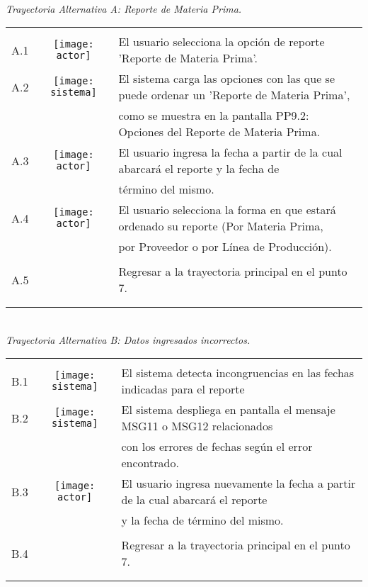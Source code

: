 \documentclass[10pt,spanish]{article}
\providecommand{\tabularnewline}{\\}
\begin{document}
\newpage
	\textit{\large \\Trayectoria Alternativa A: Reporte de Materia Prima.}
	
	\begin{tabular}{ccl}
	& & \tabularnewline
	
	A.1 & \texttt{[image: actor]} & El usuario selecciona la opción de reporte 'Reporte de Materia Prima'.\tabularnewline
		
	A.2 & \texttt{[image: sistema]} & El sistema carga las opciones con las que se puede ordenar un 'Reporte de Materia Prima', \tabularnewline
	& & como se muestra en la pantalla PP9.2: Opciones del Reporte de Materia Prima. \tabularnewline
	
	A.3 & \texttt{[image: actor]} & El usuario ingresa la fecha a partir de la cual abarcará el reporte y la fecha de \tabularnewline
& &	término del mismo.\tabularnewline

    A.4 & \texttt{[image: actor]} & El usuario selecciona la forma en que estará ordenado su reporte (Por Materia Prima,  	\tabularnewline
	& &  por Proveedor o por Línea de Producción).\tabularnewline\tabularnewline
	
	A.5 & & Regresar a la trayectoria principal en el punto 7.\tabularnewline

	
	\tabularnewline\tabularnewline	
	\end{tabular}

\textit{\large \\Trayectoria Alternativa B: Datos ingresados incorrectos.}

\begin{tabular}{ccl}
	& & \tabularnewline
	
	B.1 & \texttt{[image: sistema]} & El sistema detecta incongruencias en las fechas indicadas para el reporte\tabularnewline
		
	B.2 & \texttt{[image: sistema]} & El sistema despliega en pantalla el mensaje MSG11 o MSG12 relacionados \tabularnewline
	& & con los errores de fechas según el error encontrado. 	\tabularnewline	
	
	B.3 & \texttt{[image: actor]} & El usuario ingresa nuevamente la fecha a partir de la cual abarcará el reporte   \tabularnewline
& &	y la fecha de término del mismo.\tabularnewline    \tabularnewline    
	
	B.4 & & Regresar a la trayectoria principal en el punto 7.\tabularnewline
	
	\tabularnewline\tabularnewline	
	\end{tabular}
\end{document}
